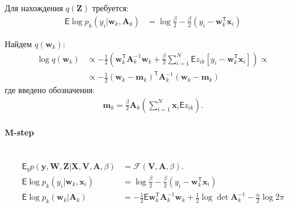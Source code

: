 \documentclass[12pt, twoside]{article}
\numberwithin{equation}{section}
\begin{document}
Для нахождения $q\left(\textbf{Z}\right)$ требуется:
\begin{equation}
\label{eq:st:17}
\begin{aligned}
\mathsf{E}\log p_{k}\left(y_{i}|\textbf{w}_k, \textbf{A}_k\right) &= \log\frac{\beta}{2} -\frac{\beta}{2}\left(y_{i}-\textbf{w}_{k}^{\mathsf{T}}\textbf{x}_{i}\right)
\end{aligned}
\end{equation}

Найдем $q\left(\textbf{w}_{k}\right)$:
\begin{equation}
\label{eq:st:18}
\begin{aligned}
\log q\left(\textbf{w}_{k}\right) &\propto -\frac{1}{2}\left(\textbf{w}_{k}^{\mathsf{T}}\textbf{A}_{k}^{-1}\textbf{w}_{k} +\frac{\beta}{2} \sum_{i=1}^{N}\mathsf{E}z_{ik}\left[y_{i} - \textbf{w}_{k}^{\mathsf{T}}\textbf{x}_{i}\right]\right) \propto\\
&\propto -\frac{1}{2}\left(\textbf{w}_{k} - \textbf{m}_{k}\right)^{\mathsf{T}}\textbf{A}_{k}^{-1}\left(\textbf{w}_{k} - \textbf{m}_{k}\right)
\end{aligned}
\end{equation}
где введено обозначения:
\begin{equation}
\label{eq:st:19}
\begin{aligned}
\textbf{m}_{k} = \frac{\beta}{2}\textbf{A}_{k}\left(\sum_{i=1}^{N}\textbf{x}_{i}\mathsf{E}z_{ik}\right).
\end{aligned}
\end{equation}

\paragraph{M-step}~
\begin{equation}
\label{eq:st:20}
\begin{aligned}
\mathsf{E}_{q} p\left(\textbf{y}, \textbf{W}, \textbf{Z}|\textbf{X}, \textbf{V}, \textbf{A}, \beta\right) &= \mathcal{F}\left(\textbf{V}, \textbf{A}, \beta\right). \\
\mathsf{E}\log p_{k}\left(y_{i}|\textbf{w}_{k}, \textbf{x}_{i}\right) &= \log\frac{\beta}{2} -\frac{\beta}{2}\left(y_{i}-\textbf{w}_{k}^{\mathsf{T}}\textbf{x}_{i}\right)\\
\mathsf{E}\log p_{k}\left(\textbf{w}_{k}|\textbf{A}_{k}\right) &= -\frac{1}{2}\mathsf{E}\textbf{w}_{k}^{\mathsf{T}}\textbf{A}_{k}^{-1}\textbf{w}_{k} + \frac{1}{2}\log\det\textbf{A}_{k}^{-1} - \frac{n}{2}\log2\pi
\end{aligned}
\end{equation}
\end{document}
